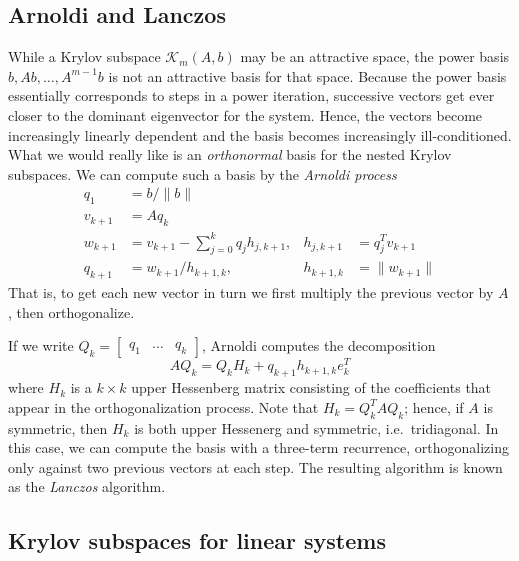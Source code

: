 \documentclass[12pt, leqno]{article}
\newcommand{\calK}{\mathcal{K}}
\begin{document}
\subsection{Arnoldi and Lanczos}

While a Krylov subspace $\calK_m(A,b)$ may be an attractive space,
the power basis $b, Ab, \ldots, A^{m-1} b$ is not an attractive basis
for that space.  Because the power basis essentially corresponds to
steps in a power iteration, successive vectors get ever closer to
the dominant eigenvector for the system.  Hence, the vectors become
increasingly linearly dependent and the basis becomes increasingly
ill-conditioned.  What we would really like is an {\em orthonormal}
basis for the nested Krylov subspaces.  We can compute such a basis
by the {\em Arnoldi process}
\begin{align*}
  q_1 &= b/\|b\| \\
  v_{k+1} &= Aq_k \\
  w_{k+1} &=
    v_{k+1} - \sum_{j=0}^{k} q_j h_{j,k+1}, & h_{j,k+1} &= q_j^T v_{k+1} \\
  q_{k+1} &=
    w_{k+1} / h_{k+1,k}, & h_{k+1,k} & = \|w_{k+1}\| 
\end{align*}
That is, to get each new vector in turn we first multiply the previous
vector by $A$, then orthogonalize.

If we write $Q_k = \begin{bmatrix} q_1 & \ldots & q_k \end{bmatrix}$,
Arnoldi computes the decomposition
\[
  A Q_k = Q_k H_k + q_{k+1} h_{k+1,k} e_k^T
\]
where $H_k$ is a $k \times k$ upper Hessenberg matrix consisting of
the coefficients that appear in the orthogonalization process.
Note that $H_k = Q_k^T A Q_k$; hence, if $A$ is symmetric, then $H_k$
is both upper Hessenerg and symmetric, i.e.~tridiagonal.  In this
case, we can compute the basis with a three-term recurrence,
orthogonalizing only against two previous vectors at each step.
The resulting algorithm is known as the {\em Lanczos} algorithm.

\subsection{Krylov subspaces for linear systems}
\end{document}

